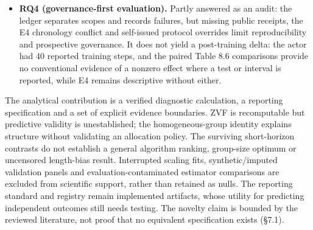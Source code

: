\documentclass[12pt,a4paper]{report}
\begin{document}
\begin{itemize}
  The revised \texttt{stackdiff} flags both exhibits from their records
  alone --- the 17× pair at R5 on checkpoint, reward and template
  (coverage 0.58) and the ``DAPO'' pair at R5 on checkpoint, reward,
  template, dataset and evaluation metric (coverage 0.87) --- and
  reports missing information separately; 342 of the 378 pairs are
  underspecified because 16 entries are hand-entered (§7.2). Whether its
  flags predict outcome differences was not tested.
\item
  \textbf{RQ4 (governance-first evaluation).} Partly answered as an
  audit: the ledger separates scopes and records failures, but missing
  public receipts, the E4 chronology conflict and self-issued protocol
  overrides limit reproducibility and prospective governance. It does
  not yield a post-training delta: the actor had 40 reported training
  steps, and the paired Table 8.6 comparisons provide no conventional
  evidence of a nonzero effect where a test or interval is reported,
  while E4 remains descriptive without either.
\end{itemize}

The analytical contribution is a verified diagnostic calculation, a
reporting specification and a set of explicit evidence boundaries. ZVF
is recomputable but predictive validity is unestablished; the
homogeneous-group identity explains structure without validating an
allocation policy. The surviving short-horizon contrasts do not
establish a general algorithm ranking, group-size optimum or uncensored
length-bias result. Interrupted scaling fits, synthetic/imputed
validation panels and evaluation-contaminated estimator comparisons are
excluded from scientific support, rather than retained as nulls. The
reporting standard and registry remain implemented artifacts, whose
utility for predicting independent outcomes still needs testing. The
novelty claim is bounded by the reviewed literature, not proof that no
equivalent specification exists (§7.1).
\end{document}
